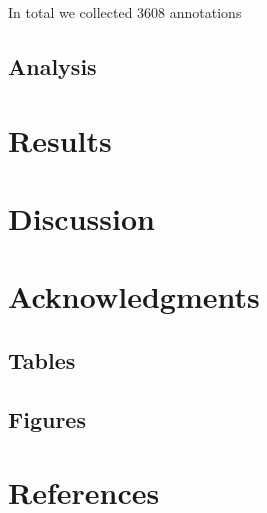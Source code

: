 \documentclass[10pt,letterpaper]{article}
\begin{document}
\noindent In total we collected 3608 annotations


\subsection{Analysis}


\section{Results}


\section{Discussion}


\section{Acknowledgments}


\subsection{Tables}


\subsection{Figures}






\section{References}



\setlength{\bibleftmargin}{.125in}
\setlength{\bibindent}{-\bibleftmargin}


\end{document}
